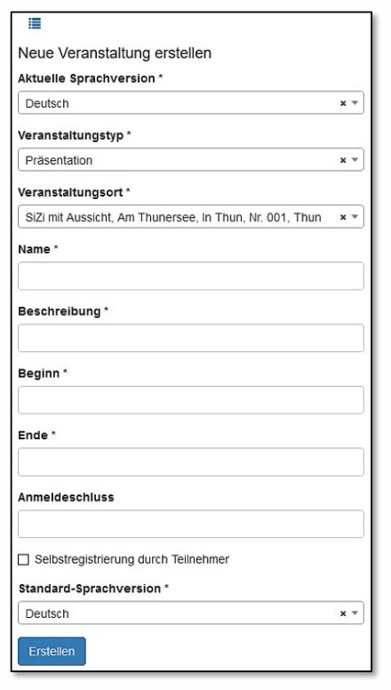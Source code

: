 \begin{figure}   %
  \vspace{-25pt}      %
  \begin{center}
    \includegraphics[width=1\linewidth]{../chapters/10_CRM/pictures/10-2-1_NeueVeranstaltung.jpg}
  \end{center}
  \vspace{-20pt}
  \vspace{-10pt}
\end{figure}

